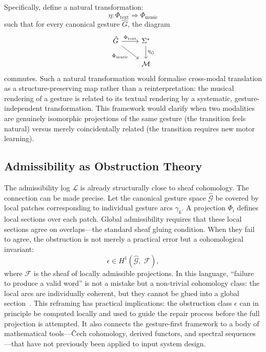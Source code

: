 \documentclass[11pt, a4paper]{article}
\begin{document}
Specifically, define a natural transformation:
\[
  \eta : \Phi_{\mathrm{text}} \Rightarrow \Phi_{\mathrm{music}}
\]
such that for every canonical gesture $\hat{G}$, the diagram
\[
\begin{tikzcd}
  \hat{G} \arrow[r, "\Phi_{\mathrm{text}}"] \arrow[dr, "\Phi_{\mathrm{music}}"']
    & \Sigma^* \arrow[d, "\eta_{\hat{G}}"] \\
    & \mathcal{M}
\end{tikzcd}
\]
commutes. Such a natural transformation would formalise cross-modal
translation as a structure-preserving map rather than a reinterpretation:
the musical rendering of a gesture is related to its textual rendering by
a systematic, gesture-independent transformation. This framework would
clarify when two modalities are genuinely isomorphic projections of the
same gesture (the transition feels natural) versus merely coincidentally
related (the transition requires new motor learning).

\subsection{Admissibility as Obstruction Theory}

The admissibility log $\mathcal{L}$ is already structurally close to
sheaf cohomology. The connection can be made precise. Let the canonical
gesture space $\hat{\mathcal{G}}$ be covered by local patches
corresponding to individual gesture arcs $\gamma_k$. A projection
$\Phi_i$ defines local sections over each patch. Global admissibility
requires that these local sections agree on overlaps---the standard
sheaf gluing condition. When they fail to agree, the obstruction is not
merely a practical error but a cohomological invariant:
\[
  \epsilon \in H^1(\hat{\mathcal{G}},\; \mathcal{F}),
\]
where $\mathcal{F}$ is the sheaf of locally admissible projections. In
this language, ``failure to produce a valid word'' is not a mistake but
a non-trivial cohomology class: the local arcs are individually coherent,
but they cannot be glued into a global section~\cite{juarrero2002}. This reframing has
practical implications: the obstruction class $\epsilon$ can in principle
be computed locally and used to guide the repair process before the full
projection is attempted. It also connects the gesture-first framework to
a body of mathematical tools---\v{C}ech cohomology, derived functors,
and spectral sequences---that have not previously been applied to input
system design.

\end{document}

